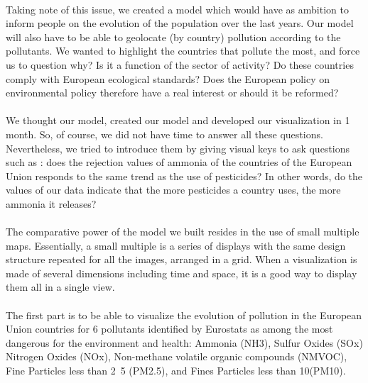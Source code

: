 \documentclass[preprint,journal]{vgtc}       %
\begin{document}
\paragraph{}
Taking note of this issue, we created a model which would have as ambition to inform people on the evolution of the population over the last years. Our model will also have to be able to geolocate (by country) pollution according to the pollutants.
We wanted to highlight the countries that pollute the most, and force us to question why? Is it a function of the sector of activity? Do these countries comply with European ecological standards? Does the European policy on environmental policy therefore have a real interest or should it be reformed?

\paragraph{}
We thought our model, created our model and developed our visualization in 1 month. So, of course, we did not have time to answer all these questions. Nevertheless, we tried to introduce them by giving visual keys to ask questions such as : does the rejection values ​​of ammonia of the countries of the European Union responds to the same trend as the use of pesticides? In other words, do the values ​​of our data indicate that the more pesticides a country uses, the more ammonia it releases?

\paragraph{}
The comparative power of the model we built resides in the use of small multiple maps. Essentially, a small multiple is a series of displays with the same design structure repeated for all the images, arranged in a grid. When a visualization is made of several dimensions including time and space, it is a good way to display them all in a single view.

\paragraph{}
The first part is to be able to visualize the evolution of pollution in the European Union countries for 6 pollutants identified by Eurostats as among the most dangerous for the environment and health: Ammonia (NH3), Sulfur Oxides (SOx) Nitrogen Oxides (NOx), Non-methane volatile organic compounds (NMVOC), Fine Particles less than \unit{2.5}{\micro\meter} (PM2.5), and Fines Particles less than \unit{10}{\micro\meter}(PM10).
\end{document}
